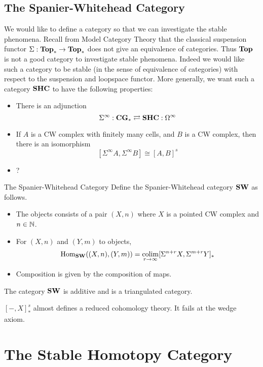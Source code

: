\documentclass[a4paper]{article}
\begin{document}
\subsection{The Spanier-Whitehead Category}
We would like to define a category so that we can investigate the stable phenomena. Recall from Model Category Theory that the classical suspension functor $\Sigma:\bold{Top}_\ast\to\bold{Top}_\ast$ does not give an equivalence of categories. Thus $\bold{Top}$ is not a good category to investigate stable phenomena. Indeed we would like such a category to be stable (in the sense of equivalence of categories) with respect to the suspension and loopspace functor. More generally, we want such a category $\bold{SHC}$ to have the following properties: 
\begin{itemize}
\item There is an adjunction $$\Sigma^\infty:\bold{CG}_\ast\rightleftarrows\bold{SHC}:\Omega^\infty$$
\item If $A$ is a CW complex with finitely many cells, and $B$ is a CW complex, then there is an isomorphism $$[\Sigma^\infty A,\Sigma^\infty B]\cong[A,B]^s$$
\item ?
\end{itemize}

\begin{defn}{The Spanier-Whitehead Category}{} Define the Spanier-Whitehead category $\bold{SW}$ as follows. 
\begin{itemize}
\item The objects consists of a pair $(X,n)$ where $X$ is a pointed CW complex and $n\in\mathbb{N}$. 
\item For $(X,n)$ and $(Y,m)$ to objects, $$\operatorname{Hom}_{\bold{SW}}((X,n),(Y,m))=\operatorname*{colim}_{r\to\infty}[\Sigma^{n+r}X,\Sigma^{m+r}Y]_\ast$$
\item Composition is given by the composition of maps. 
\end{itemize}
\end{defn}

\begin{prp}{}{} The category $\bold{SW}$ is additive and is a triangulated category. 
\end{prp}

$[-,X]_\ast^s$ almost defines a reduced cohomology theory. It fails at the wedge axiom. 

\pagebreak
\section{The Stable Homotopy Category}
\end{document}
